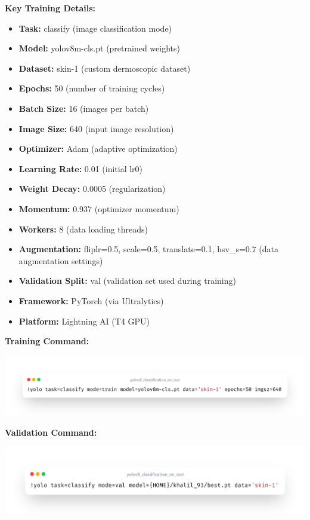 \documentclass[a4paper,12pt]{report}
\begin{document}
\begin{spacing}{1.5}
    \textbf{Key Training Details:}
    \begin{itemize}
        \item \textbf{Task:} classify (image classification mode)
        \item \textbf{Model:} yolov8m-cls.pt (pretrained weights)
        \item \textbf{Dataset:} skin-1 (custom dermoscopic dataset)
        \item \textbf{Epochs:} 50 (number of training cycles)
        \item \textbf{Batch Size:} 16 (images per batch)
        \item \textbf{Image Size:} 640 (input image resolution)
        \item \textbf{Optimizer:} Adam (adaptive optimization)
        \item \textbf{Learning Rate:} 0.01 (initial lr0)
        \item \textbf{Weight Decay:} 0.0005 (regularization)
        \item \textbf{Momentum:} 0.937 (optimizer momentum)
        \item \textbf{Workers:} 8 (data loading threads)
        \item \textbf{Augmentation:} fliplr=0.5, scale=0.5, translate=0.1, hsv\_s=0.7 (data augmentation settings)
        \item \textbf{Validation Split:} val (validation set used during training)
        \item \textbf{Framework:} PyTorch (via Ultralytics)
        \item \textbf{Platform:} Lightning AI (T4 GPU)
    \end{itemize}
    
    \textbf{Training Command:}

    \begin{center}
        \includegraphics[width=\textwidth,keepaspectratio]{code/train.png}
    \end{center}

    \textbf{Validation Command:}

    \begin{center}
        \includegraphics[width=\textwidth,keepaspectratio]{code/validation.png}
    \end{center}


\end{spacing}
\end{document}
